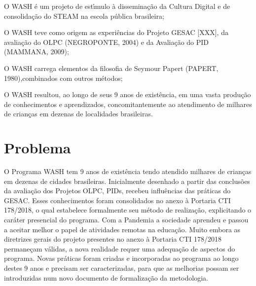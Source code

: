\documentclass[
12pt,		%
openright,	%
twoside,  %
a4paper,			%
chapter=TITLE,		%
english,			%
french,				%
spanish,			%
brazil				%
]{USPSC-classe/USPSC}
\begin{document}
\begin{alineas}
\item O WASH \'e um projeto de est\'{\i}mulo \`a dissemina\c{c}\~ao da Cultura Digital e de consolida\c{c}\~ao do STEAM na escola p\'ublica brasileira;
\item O WASH teve como origem as experi\^encias do Projeto GESAC [XXX], da avalia\c{c}\~ao do OLPC (NEGROPONTE, 2004) e da Avalia\c{c}\~ao do PID (MAMMANA, 2009);
\item O WASH carrega elementos da filosofia de Seymour Papert (PAPERT, 1980),combinados com outros m\'etodos;
\item O WASH resultou, ao longo de seus 9 anos de exist\^encia, em uma vasta produ\c{c}\~ao de conhecimentos e aprendizados, concomitantemente ao atendimento de milhares de crian\c{c}as em dezenas de localidades brasileiras.
\end{alineas}

\section[Problema]{Problema}\label{Problema}
O Programa WASH tem 9 anos de exist\^encia tendo atendido milhares de crian\c{c}as em dezenas de cidades brasileiras. Inicialmente desenhado a partir das conclus\~oes da avalia\c{c}\~ao dos Projetos OLPC, PIDs, recebeu influ\^encias das pr\'aticas do GESAC. Esses conhecimentos foram consolidados no anexo \`a Portaria CTI 178/2018, o qual estabelece formalmente seu m\'etodo de realiza\c{c}\~ao, explicitando o car\'ater presencial do programa. Com a Pandemia a sociedade aprendeu e passou a aceitar melhor o papel de atividades remotas na educa\c{c}\~ao. Muito embora as diretrizes gerais do projeto presentes no anexo \`a Portaria CTI 178/2018 permane\c{c}am v\'alidas, a nova realidade requer uma adequa\c{c}\~ao de aspectos do programa. Novas pr\'aticas foram criadas e incorporadas ao programa ao longo destes 9 anos e precisam ser caracterizadas, para que as melhorias possam ser introduzidas num novo documento de formaliza\c{c}\~ao da metodologia.
\end{document}

